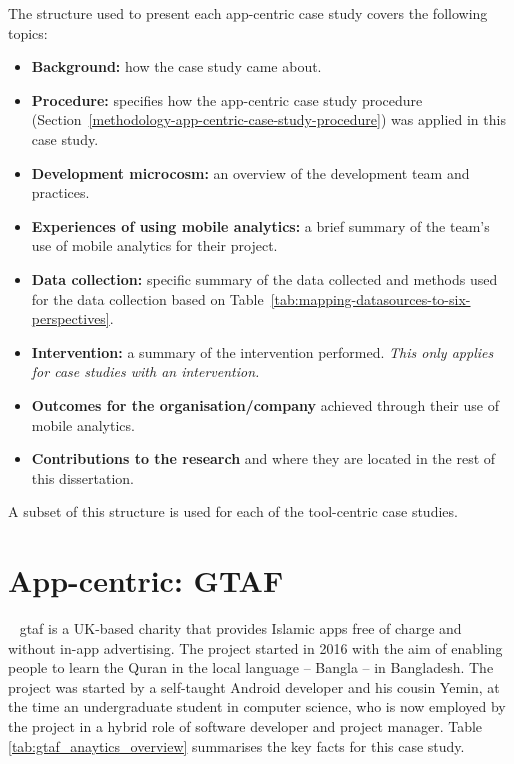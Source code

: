 The structure used to present each app-centric case study covers the following topics:
\begin{itemize}
    \itemsep0em
    \item \textbf{Background:} how the case study came about.
    \item \textbf{Procedure:} specifies how the app-centric case study procedure (Section~\ref{methodology-app-centric-case-study-procedure}) was applied in this case study.
    \item \textbf{Development microcosm:} an overview of the development team and practices.
    \item \textbf{Experiences of using mobile analytics:} a brief summary of the team's use of mobile analytics for their project.
    \item \textbf{Data collection:} specific summary of the data collected and methods used for the data collection based on Table~\ref{tab:mapping-datasources-to-six-perspectives}.
    \item \textbf{Intervention:} a summary of the intervention performed. \textit{This only applies for case studies with an intervention.}
    \item \textbf{Outcomes for the organisation/company} achieved through their use of mobile analytics.
    \item \textbf{Contributions to the research} and where they are located in the rest of this dissertation.
\end{itemize}
A subset of this structure is used for each of the tool-centric case studies. 
\clearpage





\section{App-centric: GTAF}~\label{case-study-overview-gtaf}
\Acrfull{gtaf} is a UK-based charity that provides Islamic apps free of charge and without in-app advertising. The project started in 2016 with the aim of enabling people to learn the Quran in the local language -- Bangla -- in Bangladesh. The project was started by a self-taught Android developer and his cousin Yemin, at the time an undergraduate student in computer science, who is now employed by the project in a hybrid role of software developer and project manager. Table \ref{tab:gtaf_anaytics_overview} summarises the key facts for this case study.

